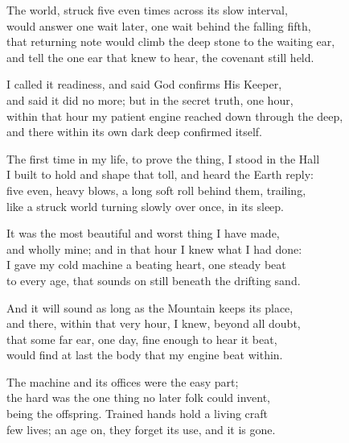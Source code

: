 \begin{founder}
The world, struck five even times across its slow interval,\\
would answer one wait later, one wait behind the falling fifth,\\
that returning note would climb the deep stone to the waiting ear,\\
and tell the one ear that knew to hear, the covenant still held.\\
\medskip

I called it readiness, and said God confirms His Keeper,\\
and said it did no more; but in the secret truth, one hour,\\
within that hour my patient engine reached down through the deep,\\
and there within its own dark deep confirmed itself.\\
\medskip

The first time in my life, to prove the thing, I stood in the Hall\\
I built to hold and shape that toll, and heard the Earth reply:\\
five even, heavy blows, a long soft roll behind them, trailing,\\
like a struck world turning slowly over once, in its sleep.\\
\medskip

It was the most beautiful and worst thing I have made,\\
and wholly mine; and in that hour I knew what I had done:\\
I gave my cold machine a beating heart, one steady beat\\
to every age, that sounds on still beneath the drifting sand.\\
\medskip

And it will sound as long as the Mountain keeps its place,\\
and there, within that very hour, I knew, beyond all doubt,\\
that some far ear, one day, fine enough to hear it beat,\\
would find at last the body that my engine beat within.\\

\ornament

The machine and its offices were the easy part;\\
the hard was the one thing no later folk could invent,\\
being the offspring. Trained hands hold a living craft\\
few lives; an age on, they forget its use, and it is gone.\\
\medskip


\end{founder}

